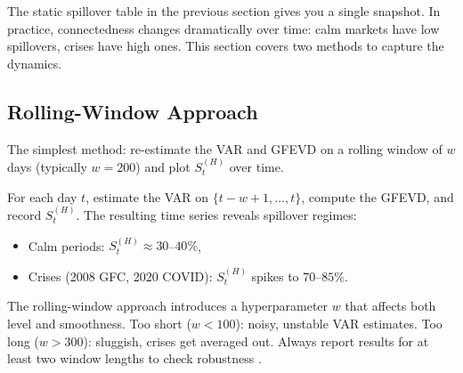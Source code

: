 The static spillover table in the previous section gives you a single snapshot.
In practice, connectedness changes dramatically over time: calm markets have low
spillovers, crises have high ones.  This section covers two methods to capture the
dynamics.

\subsection{Rolling-Window Approach}

The simplest method: re-estimate the VAR and GFEVD on a rolling window of
$w$ days (typically $w = 200$) and plot $S^{(H)}_t$ over time.

\begin{keyidea}
For each day $t$, estimate the VAR on $\{t - w + 1, \ldots, t\}$, compute the GFEVD,
and record $S^{(H)}_t$.  The resulting time series reveals spillover regimes:
\begin{itemize}[nosep]
  \item Calm periods: $S^{(H)}_t \approx 30$--$40\%$,
  \item Crises (2008 GFC, 2020 COVID): $S^{(H)}_t$ spikes to 70--$85\%$.
\end{itemize}
\end{keyidea}

\begin{warning}
The rolling-window approach introduces a hyperparameter $w$ that affects both level
and smoothness.  Too short ($w < 100$): noisy, unstable VAR estimates.
Too long ($w > 300$): sluggish, crises get averaged out.  Always report results for
at least two window lengths to check robustness \citep{DieboldYilmaz2012}.
\end{warning}

